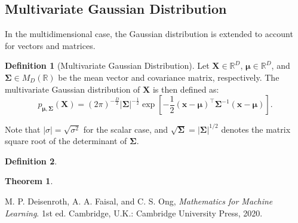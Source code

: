 \documentclass[12pt,openany]{book}
\newtheorem{theorem}{Theorem}[chapter]
\theoremstyle{definition}
\newtheorem{definition}{Definition}[chapter]
\newcommand{\mvec}[1]{\boldsymbol{#1}}
\renewcommand{\vec}[1]{\textbf{#1}}
\begin{document}
	\subsection{Multivariate Gaussian Distribution}
	
	In the multidimensional case, the Gaussian distribution is extended to account for vectors and matrices.
	
	\begin{definition}[Multivariate Gaussian Distribution]
		Let \( \vec{X} \in \mathbb{R}^D \), \( \mvec{\mu} \in \mathbb{R}^D \), and \( \mvec{\Sigma} \in M_{D}(\mathbb{R}) \) be the mean vector and covariance matrix, respectively. The multivariate Gaussian distribution of \( \vec{X} \) is then defined as:
		\[
		p_{\mvec{\mu}, \mvec{\Sigma}}(\vec{X}) = (2\pi)^{-\frac{D}{2}}|\mvec{\Sigma}|^{-\frac{1}{2}}\exp\left[-\frac{1}{2}(\vec{x} - \mvec{\mu})^\top\mvec{\Sigma}^{-1}(\vec{x} - \mvec{\mu})\right].
		\]
	\end{definition}
	
	Note that \( |\sigma| = \sqrt{\sigma^2} \) for the scalar case, and \( \sqrt{\mvec{\Sigma}} = |\mvec{\Sigma}|^{1/2} \) denotes the matrix square root of the determinant of \( \mvec{\Sigma} \).
	
	
	\begin{tcolorbox}[colframe=defcolor,title={\color{white}\bf }]
		\begin{definition}
			
		\end{definition}
	\end{tcolorbox}
	\begin{tcolorbox}[colframe=thmcolor,title={\color{white}\bf }]
		\begin{theorem}
			
		\end{theorem}
	\end{tcolorbox}

	\begin{thebibliography}{9}
		M. P. Deisenroth, A. A. Faisal, and C. S. Ong, \textit{Mathematics for Machine Learning}. 1st ed. Cambridge, U.K.: Cambridge University Press, 2020.
	\end{thebibliography}
\end{document}
